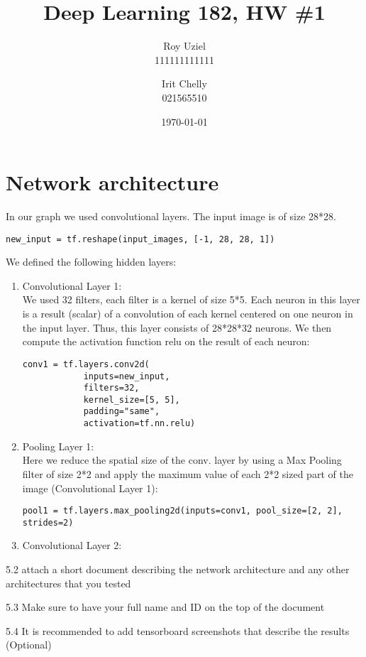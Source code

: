 \documentclass[12pt]{article}
\begin{document}
\title{Deep Learning 182, HW \#1}
\author{
Roy Uziel\\
111111111111
\and Irit Chelly\\
021565510
}
\date{\today}
\maketitle


\section{Network architecture}
In our graph we used convolutional layers.
The input image is of size 28*28.
\begin{lstlisting}[style=PyStyle]
new_input = tf.reshape(input_images, [-1, 28, 28, 1])   
\end{lstlisting}

We defined the following hidden layers:
\begin{enumerate}

\item
Convolutional Layer 1:\\
We used 32 filters, each filter is a kernel of size 5*5. Each neuron in this layer is a result (scalar) of a convolution of each kernel centered on one neuron in the input layer. Thus, this layer consists of 28*28*32 neurons.
We then compute the activation function relu on the result of each neuron:
\begin{lstlisting}[style=PyStyle]
    conv1 = tf.layers.conv2d(
            inputs=new_input,
            filters=32,
            kernel_size=[5, 5],
            padding="same",
            activation=tf.nn.relu)
\end{lstlisting}

\item
Pooling Layer 1:\\
Here we reduce	 the spatial size of the conv. layer by using a Max Pooling filter of size 2*2 and apply the maximum value of each 2*2 sized part of the image (Convolutional Layer 1): 

\begin{lstlisting}[style=PyStyle]
pool1 = tf.layers.max_pooling2d(inputs=conv1, pool_size=[2, 2], strides=2)
\end{lstlisting}

\item
Convolutional Layer 2:\\

\end{enumerate}

 

	5.2 attach a short document describing the network architecture and any other architectures that you tested

	5.3 Make sure to have your full name and ID on the top of the document

	5.4 It is recommended to add tensorboard screenshots that describe the results (Optional)
	
\end{document}
